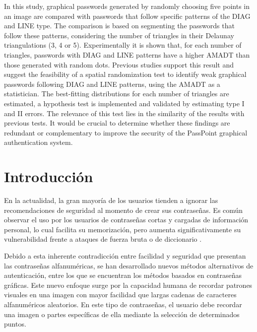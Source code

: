 \documentclass[12pt]{report}
\begin{document}
	In this study, graphical passwords generated by randomly choosing five points in an image are compared with passwords that follow specific patterns of the DIAG and LINE type. The comparison is based on segmenting the passwords that follow these patterns, considering the number of triangles in their Delaunay triangulations (3, 4 or 5). Experimentally it is shown that, for each number of triangles, passwords with DIAG and LINE patterns have a higher AMADT than those generated with random dots. Previous studies support this result and suggest the feasibility of a spatial randomization test to identify weak graphical passwords following DIAG and LINE patterns, using the AMADT as a statistician. The best-fitting distributions for each number of triangles are estimated, a hypothesis test is implemented and validated by estimating type I and II errors. The relevance of this test lies in the similarity of the results with previous tests. It would be crucial to determine whether these findings are redundant or complementary to improve the security of the PassPoint graphical authentication system.


\tableofcontents
\newpage
\listoffigures
\newpage
\listoftables


\chapter*{\LARGE{Introducción}}
\hypertarget{introduccion}{}


	En la actualidad, la gran mayoría de los usuarios tienden a ignorar las recomendaciones de seguridad al momento de crear sus contraseñas. Es común observar el uso por los usuarios de contraseñas cortas y cargadas de información personal, lo cual facilita su memorización, pero aumenta significativamente su vulnerabilidad frente a ataques de fuerza bruta o de diccionario \cite{1,2,3,4}.
	
	Debido a esta inherente contradicción entre facilidad y seguridad que presentan las contraseñas alfanuméricas, se han desarrollado nuevos métodos alternativos de autenticación, entre los que se encuentran los métodos basados  en contraseñas gráficas. Este nuevo enfoque surge por la capacidad humana de recordar patrones visuales en una imagen con mayor facilidad que largas cadenas de caracteres alfanuméricos aleatorios. En este tipo de contraseñas, el usuario debe recordar una imagen o partes específicas de ella mediante la selección  de determinados puntos.
	
\end{document}
